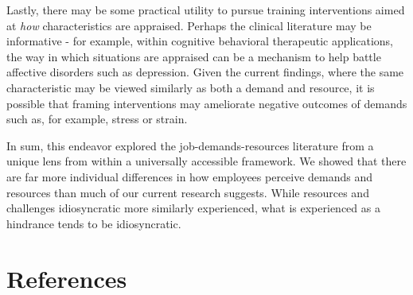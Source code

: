 \documentclass[
  english,
  man]{apa6}
\begin{document}
Lastly, there may be some practical utility to pursue training interventions aimed at \emph{how} characteristics are appraised. Perhaps the clinical literature may be informative - for example, within cognitive behavioral therapeutic applications, the way in which situations are appraised can be a mechanism to help battle affective disorders such as depression. Given the current findings, where the same characteristic may be viewed similarly as both a demand and resource, it is possible that framing interventions may ameliorate negative outcomes of demands such as, for example, stress or strain.

In sum, this endeavor explored the job-demands-resources literature from a unique lens from within a universally accessible framework. We showed that there are far more individual differences in how employees perceive demands and resources than much of our current research suggests. While resources and challenges idiosyncratic more similarly experienced, what is experienced as a hindrance tends to be idiosyncratic.

\newpage

\hypertarget{references}{%
\section{References}\label{references}}

\begingroup
\setlength{\parindent}{-0.5in}
\setlength{\leftskip}{0.5in}
\end{document}
